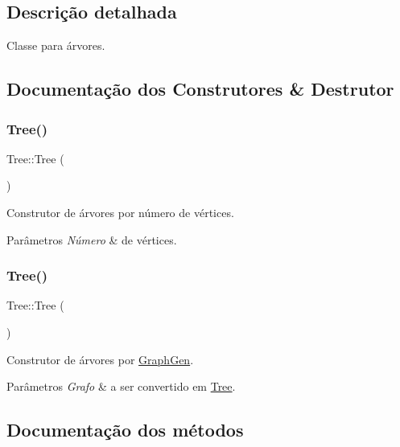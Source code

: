\subsection{Descrição detalhada}
Classe para árvores. 

\subsection{Documentação dos Construtores \& Destrutor}
\mbox{\label{classTree_a25977c120f94e833fdd7739daa9b8d89}} 
\subsubsection{\texorpdfstring{Tree()}{Tree()}\hspace{0.1cm}{\footnotesize\ttfamily [1/2]}}
{\footnotesize\ttfamily Tree\+::\+Tree (\begin{DoxyParamCaption}\item[{int}]{ }\end{DoxyParamCaption})}

Construtor de árvores por número de vértices. 
\begin{DoxyParams}{Parâmetros}
{\em Número} & de vértices. \\
\hline
\end{DoxyParams}
\mbox{\label{classTree_a9f7d6a13c19b6525ee504079a5ffbd8e}} 
\subsubsection{\texorpdfstring{Tree()}{Tree()}\hspace{0.1cm}{\footnotesize\ttfamily [2/2]}}
{\footnotesize\ttfamily Tree\+::\+Tree (\begin{DoxyParamCaption}\item[{\hyperlink{classGraphGen}{Graph\+Gen} \&}]{ }\end{DoxyParamCaption})}

Construtor de árvores por \hyperlink{classGraphGen}{Graph\+Gen}. 
\begin{DoxyParams}{Parâmetros}
{\em Grafo} & a ser convertido em \hyperlink{classTree}{Tree}. \\
\hline
\end{DoxyParams}


\subsection{Documentação dos métodos}
\mbox{\label{classTree_af13c3d7650185d8703c5483d3b24a5e5}} 
